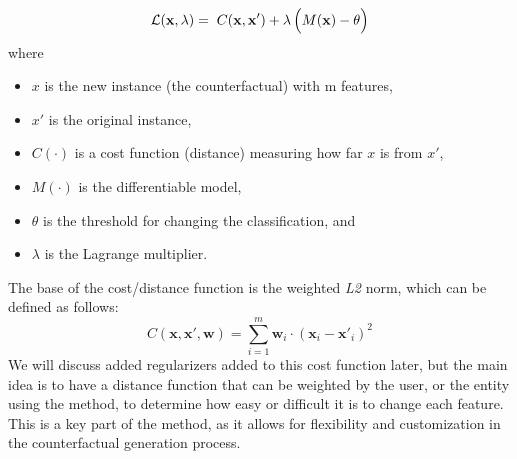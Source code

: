 \documentclass[12pt]{extarticle}
\numberwithin{equation}{section}
\begin{document}
\begin{equation}\label{eq:lagrange}
\mathcal{L}(\mathbf{x}, \lambda) = \; C(\mathbf{x}, \mathbf{x}') + \lambda \, \Bigl(M(\mathbf{x}) - \theta \Bigr)
\end{equation}
where
\begin{itemize}
  \item $x$ is the new instance (the counterfactual) with m features,
  \item $x'$ is the original instance,
  \item $C(\cdot)$ is a cost function (distance) measuring how far $x$ is from $x'$,
  \item $M(\cdot)$ is the differentiable model, 
  \item $\theta$ is the threshold for changing the classification, and
  \item $\lambda$ is the Lagrange multiplier.
\end{itemize}
The base of the cost/distance function is the weighted \emph{L2} norm, which can be defined as follows:
\begin{equation}\label{eq:cost}
    C(\mathbf{x}, \mathbf{x}', \mathbf{w}) = \sum_{i=1}^{m} \mathbf{w}_i \cdot (\mathbf{x}_i - \mathbf{x}'_{i})^2
\end{equation}
We will discuss added regularizers added to this cost function later, but the main idea is to have a distance function that can be weighted by the user, or the entity using the method, to determine how easy or difficult it is to change each feature. This is a key part of the method, as it allows for flexibility and customization in the counterfactual generation process.
\end{document}
